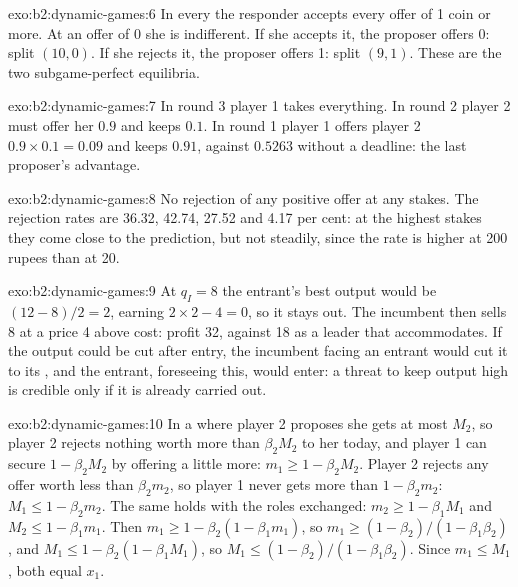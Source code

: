 \begin{solution}{exo:b2:dynamic-games:6}
In every  the responder accepts every offer of 1 coin or more. At an offer of 0 she is
indifferent. If she accepts it, the proposer offers 0: split $(10, 0)$. If she rejects it, the proposer offers 1:
split $(9, 1)$. These are the two subgame-perfect equilibria.
\end{solution}

\begin{solution}{exo:b2:dynamic-games:7}
In round 3 player 1 takes everything. In round 2 player 2 must offer her $0.9$ and keeps $0.1$. In round 1 player 1
offers player 2 $0.9 \times 0.1 = 0.09$ and keeps $0.91$, against $0.5263$ without a deadline: the last proposer's advantage.
\end{solution}

\begin{solution}{exo:b2:dynamic-games:8}
No rejection of any positive offer at any stakes. The rejection rates are 36.32, 42.74, 27.52 and 4.17 per cent: at
the highest stakes they come close to the prediction, but not steadily, since the rate is higher at 200 rupees
than at 20.
\end{solution}

\begin{solution}{exo:b2:dynamic-games:9}
At $q_I = 8$ the entrant's best output would be $(12 - 8)/2 = 2$, earning $2 \times 2 - 4 = 0$, so it stays out. The
incumbent then sells 8 at a price 4 above cost: profit 32, against 18 as a leader that accommodates. If the output
could be cut after entry, the incumbent facing an entrant would cut it to its , and the entrant,
foreseeing this, would enter: a threat to keep output high is credible only if it is already carried out.
\end{solution}

\begin{solution}{exo:b2:dynamic-games:10}
In a  where player 2 proposes she gets at most $M_2$, so player 2 rejects nothing worth more than $\beta_2 M_2$ to
her today, and player 1 can secure $1 - \beta_2 M_2$ by offering a little more: $m_1 \ge 1 - \beta_2 M_2$. Player 2 rejects any
offer worth less than $\beta_2 m_2$, so player 1 never gets more than $1 - \beta_2 m_2$: $M_1 \le 1 - \beta_2 m_2$. The same holds with the
roles exchanged: $m_2 \ge 1 - \beta_1 M_1$ and $M_2 \le 1 - \beta_1 m_1$. Then $m_1 \ge 1 - \beta_2(1 - \beta_1 m_1)$, so $m_1 \ge (1 - \beta_2)/(1 -
\beta_1\beta_2)$, and $M_1 \le 1 - \beta_2(1 - \beta_1 M_1)$, so $M_1 \le (1 - \beta_2)/(1 - \beta_1\beta_2)$. Since $m_1 \le M_1$, both equal $x_1$.
\end{solution}

